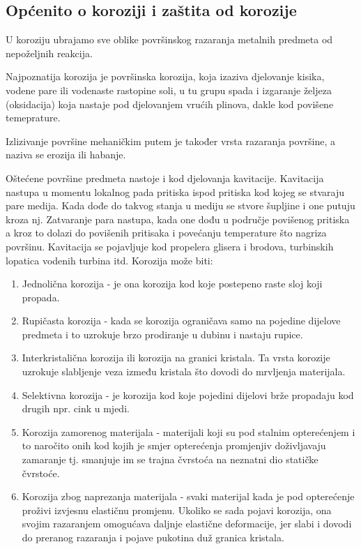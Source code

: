 \documentclass[a4paper,12pt]{article}
\numberwithin{figure}{section}
\begin{document}
\subsection{Općenito o koroziji i zaštita od korozije}
U koroziju ubrajamo sve oblike površinskog razaranja metalnih predmeta od nepoželjnih reakcija.\par
Najpoznatija korozija je površinska korozija, koja izaziva djelovanje kisika, vodene pare ili vodenaste rastopine soli, u tu grupu spada i izgaranje željeza (oksidacija) koja nastaje pod djelovanjem vrućih plinova, dakle kod povišene temeprature.\par
Izlizivanje površine mehaničkim putem je također vrsta razaranja površine, a naziva se erozija ili habanje.\par
Oštećene površine predmeta nastoje i kod djelovanja kavitacije. Kavitacija nastupa u momentu lokalnog pada pritiska ispod pritiska kod kojeg se stvaraju pare medija. Kada dođe do takvog stanja u mediju se stvore šupljine i one putuju kroza nj. Zatvaranje para nastupa, kada one dođu u područje povišenog pritiska a kroz to dolazi do povišenih pritisaka i povećanju temperature što nagriza površinu. Kavitacija se pojavljuje kod propelera glisera i brodova, turbinskih lopatica vodenih turbina itd. Korozija može biti:
\begin{enumerate}
\item Jednolična korozija - je ona korozija kod koje postepeno raste sloj koji propada.
\item Rupičasta korozija - kada se korozija ograničava samo na pojedine dijelove predmeta i to uzrokuje brzo prodiranje u dubinu i nastaju rupice.
\item Interkristalična korozija ili korozija na granici kristala. Ta vrsta korozije uzrokuje slabljenje veza između kristala što dovodi do mrvljenja materijala.
\item Selektivna korozija - je korozija kod koje pojedini dijelovi brže propadaju kod drugih npr. cink u mjedi.
\item Korozija zamorenog materijala - materijali koji su pod stalnim opterećenjem i to naročito onih kod kojih je smjer opterećenja promjenjiv doživljavaju zamaranje tj. smanjuje im se trajna čvrstoća na neznatni dio statičke čvrstoće.
\item Korozija zbog naprezanja materijala - svaki materijal kada je pod opterećenje proživi izvjesnu elastičnu promjenu. Ukoliko se sada pojavi korozija, ona svojim razaranjem omogućava daljnje elastične deformacije, jer slabi i dovodi do preranog razaranja i pojave pukotina duž granica kristala.
\end{enumerate}
\end{document}
